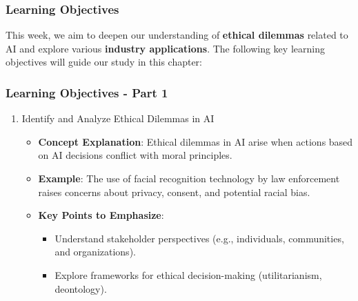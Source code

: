 \documentclass[aspectratio=169]{beamer}
\begin{document}
\begin{frame}[fragile]
    \frametitle{Learning Objectives}
    This week, we aim to deepen our understanding of \textbf{ethical dilemmas} related to AI and explore various \textbf{industry applications}. 
    The following key learning objectives will guide our study in this chapter:
\end{frame}

\begin{frame}[fragile]
    \frametitle{Learning Objectives - Part 1}
    \begin{enumerate}
        \item Identify and Analyze Ethical Dilemmas in AI
            \begin{itemize}
                \item \textbf{Concept Explanation}: Ethical dilemmas in AI arise when actions based on AI decisions conflict with moral principles.
                \item \textbf{Example}: The use of facial recognition technology by law enforcement raises concerns about privacy, consent, and potential racial bias.
                \item \textbf{Key Points to Emphasize}: 
                    \begin{itemize}
                        \item Understand stakeholder perspectives (e.g., individuals, communities, and organizations).
                        \item Explore frameworks for ethical decision-making (utilitarianism, deontology).
                    \end{itemize}
            \end{itemize}
    \end{enumerate}
\end{frame}
\end{document}
